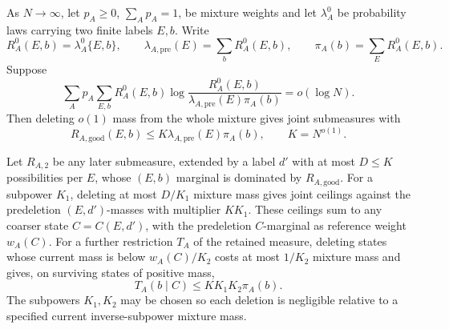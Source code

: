 \begin{lemma}
\label{a03:finite-state-conditioning}
As \(N\to\infty\), let \(p_A\ge0\), \(\sum_Ap_A=1\), be mixture weights and let
\(\lambda_A^0\) be probability laws carrying two finite labels
\(E,b\).  Write
\[
 R_A^0(E,b)=\lambda_A^0\{E,b\},\qquad
 \lambda_{A,\mathrm{pre}}(E)=\sum_bR_A^0(E,b),\qquad
 \pi_A(b)=\sum_E R_A^0(E,b).
\]
Suppose
\[
 \sum_Ap_A\sum_{E,b}R_A^0(E,b)
 \log\frac{R_A^0(E,b)}
 {\lambda_{A,\mathrm{pre}}(E)\pi_A(b)}=o(\log N).
\]
Then deleting \(o(1)\) mass from the whole mixture gives joint
submeasures with
\begin{equation}
 R_{A,\mathrm{good}}(E,b)
 \le K\lambda_{A,\mathrm{pre}}(E)\pi_A(b),
 \qquad K=N^{o(1)}.
 \label{a03:palette-joint}
\end{equation}

Let \(R_{A,2}\) be any later submeasure, extended by a label \(d'\)
with at most \(D\le K\) possibilities per \(E\), whose \((E,b)\)
marginal is dominated by \(R_{A,\mathrm{good}}\).  For a subpower
\(K_1\), deleting at most \(D/K_1\) mixture mass gives joint ceilings
against the predeletion \((E,d')\)-masses with multiplier \(KK_1\).
These ceilings sum to any coarser state \(C=C(E,d')\), with the
predeletion \(C\)-marginal as reference weight \(w_A(C)\).
For a further restriction \(T_A\) of the retained measure, deleting
states whose current
mass is below \(w_A(C)/K_2\) costs at most \(1/K_2\) mixture mass
and gives, on surviving states of positive mass,
\[
 T_A(b\mid C)\le KK_1K_2\pi_A(b).
\]
The subpowers \(K_1,K_2\) may be chosen so each deletion is negligible
relative to a specified current inverse-subpower mixture mass.
\end{lemma}
